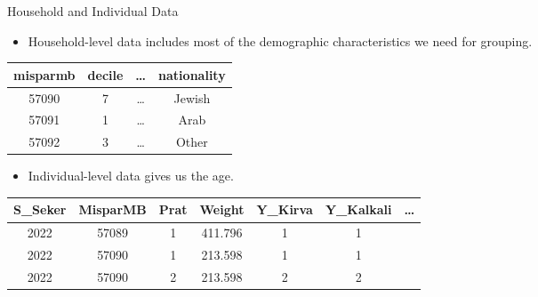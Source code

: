 \documentclass{beamer}
\begin{document}
\begin{frame}{Household and Individual Data}
    \begin{itemize}
        \item Household-level data includes most of the demographic characteristics we need for grouping.
    \end{itemize}
    \begin{table}[h!]
        \centering
        \begin{tabular}{c c c c}
            \hline
            \textbf{misparmb} & \textbf{decile} & \textbf{\ldots} & \textbf{nationality} \\
            \hline
            57090             & 7               & \ldots          & Jewish               \\
            \hline
            57091             & 1               & \ldots          & Arab                 \\
            \hline
            57092             & 3               & \ldots          & Other                \\
            \hline
        \end{tabular}
        \label{tab:summary}
    \end{table}
    \begin{itemize}
        \item Individual-level data gives us the age.
    \end{itemize}
    \begin{table}[h]
        \centering
        \begin{tabular}{c c c c c c c}
            \hline
            S\_Seker & MisparMB & Prat & Weight  & Y\_Kirva & Y\_Kalkali & \ldots \\
            \hline
            2022     & 57089    & 1    & 411.796 & 1        & 1          &        \\
            2022     & 57090    & 1    & 213.598 & 1        & 1          &        \\
            2022     & 57090    & 2    & 213.598 & 2        & 2          &        \\
            \hline
        \end{tabular}
        \label{tab:sample_data}
    \end{table}
\end{frame}
\end{document}
